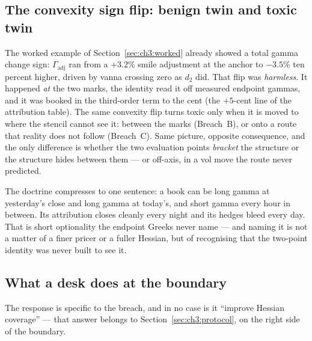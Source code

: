 \documentclass[11pt]{book}
\theoremstyle{plain}
\theoremstyle{definition}
\theoremstyle{remark}
\newcommand{\Gadj}{\Gamma_{\mathrm{adj}}}        %
\begin{document}
\subsection{The convexity sign flip: benign twin and toxic twin}
\label{sec:ch3:signflip}

The worked example of Section~\ref{sec:ch3:worked} already showed a total gamma
change sign: $\Gadj$ ran from a $+3.2\%$ smile adjustment at the anchor to
$-3.5\%$ ten percent higher, driven by vanna crossing zero as $d_2$ did. That
flip was \emph{harmless}. It happened \emph{at} the two marks, the identity read
it off measured endpoint gammas, and it was booked in the third-order term to
the cent (the $+5$-cent line of the attribution table). The same convexity flip
turns toxic only when it is moved to where the stencil cannot see it: between
the marks (Breach~B), or onto a route that reality does not follow (Breach~C).
Same picture, opposite consequence, and the only difference is whether the two
evaluation points \emph{bracket} the structure or the structure hides between
them --- or off-axis, in a vol move the route never predicted.

The doctrine compresses to one sentence: a book can be long gamma at yesterday's
close and long gamma at today's, and short gamma every hour in between. Its
attribution closes cleanly every night and its hedges bleed every day. That is
short optionality the endpoint Greeks never name --- and naming it is not a
matter of a finer pricer or a fuller Hessian, but of recognising that the
two-point identity was never built to see it.

\subsection{What a desk does at the boundary}\label{sec:ch3:toxic-response}

The response is specific to the breach, and in no case is it ``improve Hessian
coverage'' --- that answer belongs to Section~\ref{sec:ch3:protocol}, on the
right side of the boundary.
\end{document}
